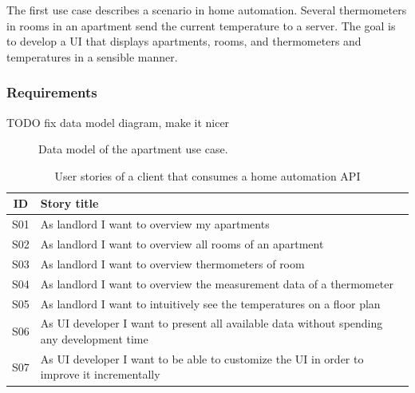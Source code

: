 The first use case describes a scenario in home automation. Several thermometers in rooms in an apartment send the current temperature to a server. The goal is to develop a UI that displays apartments, rooms, and thermometers and temperatures in a sensible manner.

\subsubsection{Requirements}

TODO fix data model diagram, make it nicer
\begin{figure}[!htb]
  \caption{Data model of the apartment use case.}
\end{figure}

\begin{table}
  \begin{center}
    \begin{tabular}{ |c|l| }
      \hline
      ID & Story title \\
      \hline
      S01 & As landlord I want to overview my apartments \\
      S02 & As landlord I want to overview all rooms of an apartment \\
      S03 & As landlord I want to overview thermometers of room \\
      S04 & As landlord I want to overview the measurement data of a thermometer \\
      S05 & As landlord I want to intuitively see the temperatures on a floor plan \\
      S06 & As UI developer I want to present all available data without spending any development time \\
      S07 & As UI developer I want to be able to customize the UI in order to improve it incrementally \\
      \hline
    \end{tabular}
    \caption{User stories of a client that consumes a home automation API}
    \label{tab:usecase1}
  \end{center}
\end{table}

